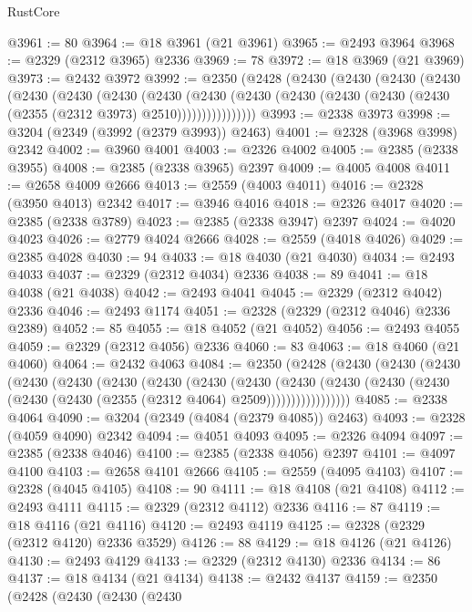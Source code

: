 \begin{lexlean}{RustCore}
\begin{coremodule}
@3961 := 80
@3964 := @18 @3961 (@21 @3961)
@3965 := @2493 @3964
@3968 := @2329 (@2312 @3965) @2336
@3969 := 78
@3972 := @18 @3969 (@21 @3969)
@3973 := @2432 @3972
@3992 := @2350
    (@2428
      (@2430
        (@2430
          (@2430
            (@2430
              (@2430
                (@2430
                  (@2430
                    (@2430
                      (@2430
                        (@2430
                          (@2430 (@2430 (@2430 (@2430 (@2355 (@2312 @3973) @2510))))))))))))))))
@3993 := @2338 @3973
@3998 := @3204 (@2349 (@3992 (@2379 @3993)) @2463)
@4001 := @2328 (@3968 @3998) @2342
@4002 := @3960 @4001
@4003 := @2326 @4002
@4005 := @2385 (@2338 @3955)
@4008 := @2385 (@2338 @3965) @2397
@4009 := @4005 @4008
@4011 := @2658 @4009 @2666
@4013 := @2559 (@4003 @4011)
@4016 := @2328 (@3950 @4013) @2342
@4017 := @3946 @4016
@4018 := @2326 @4017
@4020 := @2385 (@2338 @3789)
@4023 := @2385 (@2338 @3947) @2397
@4024 := @4020 @4023
@4026 := @2779 @4024 @2666
@4028 := @2559 (@4018 @4026)
@4029 := @2385 @4028
@4030 := 94
@4033 := @18 @4030 (@21 @4030)
@4034 := @2493 @4033
@4037 := @2329 (@2312 @4034) @2336
@4038 := 89
@4041 := @18 @4038 (@21 @4038)
@4042 := @2493 @4041
@4045 := @2329 (@2312 @4042) @2336
@4046 := @2493 @1174
@4051 := @2328 (@2329 (@2312 @4046) @2336 @2389)
@4052 := 85
@4055 := @18 @4052 (@21 @4052)
@4056 := @2493 @4055
@4059 := @2329 (@2312 @4056) @2336
@4060 := 83
@4063 := @18 @4060 (@21 @4060)
@4064 := @2432 @4063
@4084 := @2350
    (@2428
      (@2430
        (@2430
          (@2430
            (@2430
              (@2430
                (@2430
                  (@2430
                    (@2430
                      (@2430
                        (@2430
                          (@2430
                            (@2430 (@2430 (@2430 (@2430 (@2355 (@2312 @4064) @2509)))))))))))))))))
@4085 := @2338 @4064
@4090 := @3204 (@2349 (@4084 (@2379 @4085)) @2463)
@4093 := @2328 (@4059 @4090) @2342
@4094 := @4051 @4093
@4095 := @2326 @4094
@4097 := @2385 (@2338 @4046)
@4100 := @2385 (@2338 @4056) @2397
@4101 := @4097 @4100
@4103 := @2658 @4101 @2666
@4105 := @2559 (@4095 @4103)
@4107 := @2328 (@4045 @4105)
@4108 := 90
@4111 := @18 @4108 (@21 @4108)
@4112 := @2493 @4111
@4115 := @2329 (@2312 @4112) @2336
@4116 := 87
@4119 := @18 @4116 (@21 @4116)
@4120 := @2493 @4119
@4125 := @2328 (@2329 (@2312 @4120) @2336 @3529)
@4126 := 88
@4129 := @18 @4126 (@21 @4126)
@4130 := @2493 @4129
@4133 := @2329 (@2312 @4130) @2336
@4134 := 86
@4137 := @18 @4134 (@21 @4134)
@4138 := @2432 @4137
@4159 := @2350
    (@2428
      (@2430
        (@2430
          (@2430

\end{coremodule}
\end{lexlean}
